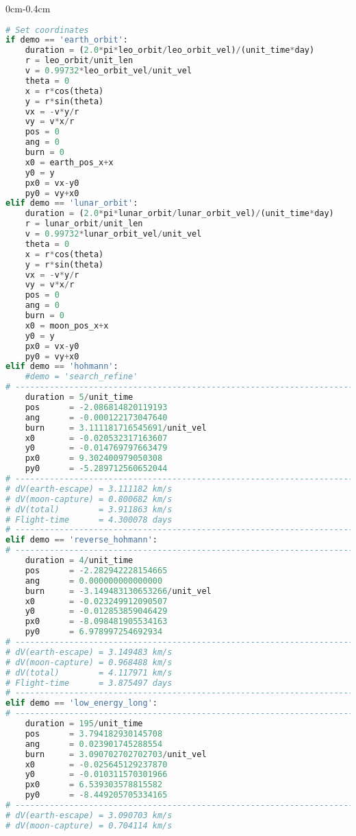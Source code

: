 \begin{adjustwidth*}{0cm}{-0.4cm}
\begin{lstlisting}[language=Python]
# Set coordinates
if demo == 'earth_orbit':
    duration = (2.0*pi*leo_orbit/leo_orbit_vel)/(unit_time*day)
    r = leo_orbit/unit_len
    v = 0.99732*leo_orbit_vel/unit_vel
    theta = 0
    x = r*cos(theta)
    y = r*sin(theta)
    vx = -v*y/r
    vy = v*x/r
    pos = 0
    ang = 0
    burn = 0
    x0 = earth_pos_x+x
    y0 = y
    px0 = vx-y0
    py0 = vy+x0
elif demo == 'lunar_orbit':
    duration = (2.0*pi*lunar_orbit/lunar_orbit_vel)/(unit_time*day)
    r = lunar_orbit/unit_len
    v = 0.99732*lunar_orbit_vel/unit_vel
    theta = 0
    x = r*cos(theta)
    y = r*sin(theta)
    vx = -v*y/r
    vy = v*x/r
    pos = 0
    ang = 0
    burn = 0
    x0 = moon_pos_x+x
    y0 = y
    px0 = vx-y0
    py0 = vy+x0
elif demo == 'hohmann':
    #demo = 'search_refine'
# --------------------------------------------------------------------------
    duration = 5/unit_time
    pos      = -2.086814820119193
    ang      = -0.000122173047640
    burn     = 3.111181716545691/unit_vel
    x0       = -0.020532317163607
    y0       = -0.014769797663479
    px0      = 9.302400979050308
    py0      = -5.289712560652044
# --------------------------------------------------------------------------
# dV(earth-escape) = 3.111182 km/s
# dV(moon-capture) = 0.800682 km/s
# dV(total)        = 3.911863 km/s
# Flight-time      = 4.300078 days
# --------------------------------------------------------------------------
elif demo == 'reverse_hohmann':
# --------------------------------------------------------------------------
    duration = 4/unit_time
    pos      = -2.282942228154665
    ang      = 0.000000000000000
    burn     = -3.149483130653266/unit_vel
    x0       = -0.023249912090507
    y0       = -0.012853859046429
    px0      = -8.098481905534163
    py0      = 6.978997254692934
# --------------------------------------------------------------------------
# dV(earth-escape) = 3.149483 km/s
# dV(moon-capture) = 0.968488 km/s
# dV(total)        = 4.117971 km/s
# Flight-time      = 3.875497 days
# --------------------------------------------------------------------------
elif demo == 'low_energy_long':
# --------------------------------------------------------------------------
    duration = 195/unit_time
    pos      = 3.794182930145708
    ang      = 0.023901745288554
    burn     = 3.090702702702703/unit_vel
    x0       = -0.025645129237870
    y0       = -0.010311570301966
    px0      = 6.539303578815582
    py0      = -8.449205705334165
# --------------------------------------------------------------------------
# dV(earth-escape) = 3.090703 km/s
# dV(moon-capture) = 0.704114 km/s

\end{lstlisting}
\end{adjustwidth*}
